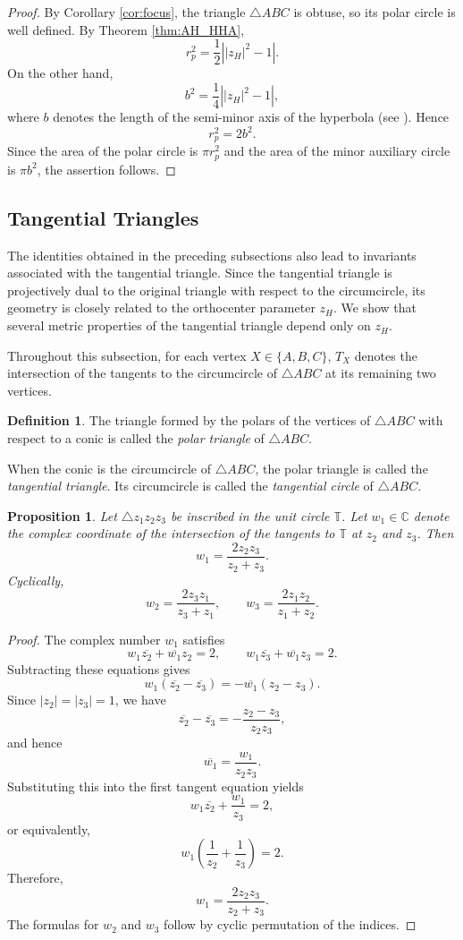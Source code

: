 \documentclass[11pt,reqno]{amsart}
\newtheorem{proposition}{Proposition}[section]
\theoremstyle{definition}
\newtheorem{definition}{Definition}[section]
\numberwithin{equation}{section}
\begin{document}
\begin{proof}
By Corollary \ref{cor:focus}, the triangle $\triangle ABC$ is obtuse, so its polar circle is well defined. By Theorem \ref{thm:AH_HHA},
\[
r_p^2=\frac12\left||z_H|^2-1\right|.
\]
On the other hand,
\[
b^2=\frac14\left||z_H|^2-1\right|,
\]
where $b$ denotes the length of the semi-minor axis of the hyperbola (see \cite[Corollary 2.3]{Murad2026b}). Hence
\[
r_p^2=2b^2.
\]
Since the area of the polar circle is $\pi r_p^2$ and the area of the minor auxiliary circle is $\pi b^2$, the assertion follows.
\end{proof}

\subsection{Tangential Triangles}\label{sec:tangtri}
The identities obtained in the preceding subsections also lead to invariants associated with the tangential triangle. Since the tangential triangle is projectively dual to the original triangle with respect to the circumcircle, its geometry is closely related to the orthocenter parameter $z_H$. We show that several metric properties of the tangential triangle depend only on $z_H$.

Throughout this subsection, for each vertex $X\in \{A,B,C\}$, $T_X$ denotes the intersection of the tangents to the circumcircle of $\triangle ABC$ at its remaining two vertices.
\begin{definition}
The triangle formed by the polars of the vertices of $\triangle ABC$ with respect to a conic is called the \emph{polar triangle} of $\triangle ABC$.

When the conic is the circumcircle of $\triangle ABC$, the polar triangle is called the \emph{tangential triangle}. Its circumcircle is
called the \emph{tangential circle} of $\triangle ABC$.
\end{definition}

\begin{proposition}\label{prop:tangentialcoord}
Let $\triangle z_1z_2z_3$ be inscribed in the unit circle $\mathbb T$. Let $w_1 \in \mathbb C$ denote the complex coordinate of the intersection of the tangents to $\mathbb T$ at $z_2$ and $z_3$. Then
\[
w_1=\frac{2z_2z_3}{z_2+z_3}.
\]
Cyclically,
\[
w_2=\frac{2z_3z_1}{z_3+z_1},\qquad
w_3=\frac{2z_1z_2}{z_1+z_2}.
\]
\end{proposition}
\begin{proof}
The complex number $w_1$ satisfies
\[
w_1\overline{z_2}+\overline{w_1}z_2=2,
\qquad
w_1\overline{z_3}+\overline{w_1}z_3=2.
\]
Subtracting these equations gives
\[
w_1(\overline{z_2}-\overline{z_3})
=
-\overline{w_1}(z_2-z_3).
\]
Since $|z_2|=|z_3|=1$, we have
\[
\overline{z_2}-\overline{z_3}
=
-\frac{z_2-z_3}{z_2z_3},
\]
and hence
\[
\overline{w_1}
=
\frac{w_1}{z_2z_3}.
\]
Substituting this into the first tangent equation yields
\[
w_1\overline{z_2}
+\frac{w_1}{z_3}
=2,
\]
or equivalently,
\[
w_1\left(\frac{1}{z_2}+\frac{1}{z_3}\right)=2.
\]
Therefore,
\[
w_1=\frac{2z_2z_3}{z_2+z_3}.
\]
The formulas for $w_2$ and $w_3$ follow by cyclic permutation of the
indices.
\end{proof}
\end{document}
